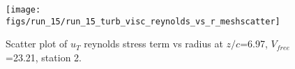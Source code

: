 \begin{figure}[H]
\centering
\texttt{[image: figs/run\_15/run\_15\_turb\_visc\_reynolds\_vs\_r\_meshscatter]}
\caption{Scatter plot of $
u_T$ reynolds stress term vs radius at $z/c$=6.97, $V_{free}$=23.21, station 2.}
\label{fig:run_15_turb_visc_reynolds_vs_r_meshscatter}
\end{figure}


